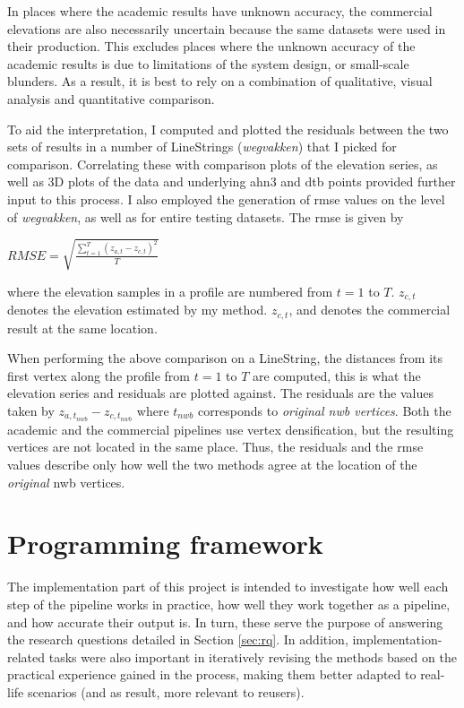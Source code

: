 In places where the academic results have unknown accuracy, the commercial elevations are also necessarily uncertain because the same datasets were used in their production. This excludes places where the unknown accuracy of the academic results is due to limitations of the system design, or small-scale blunders. As a result, it is best to rely on a combination of qualitative, visual analysis and quantitative comparison.

To aid the interpretation, I computed and plotted the residuals between the two sets of results in a number of LineStrings (\textit{wegvakken}) that I picked for comparison. Correlating these with comparison plots of the elevation series, as well as 3D plots of the data and underlying \ac{ahn3} and \ac{dtb} points provided further input to this process. I also employed the generation of \ac{rmse} values on the level of \textit{wegvakken}, as well as for entire testing datasets. The \ac{rmse} is given by

$RMSE = \sqrt{\frac{\sum_{t=1}^{T}\left(z_{a,t} - z_{c,t}\right)^2}{T}}$

where the elevation samples in a profile are numbered from $t=1$ to $T$. $z_{c,t}$ denotes the elevation estimated by my method. $z_{c,t}$, and denotes the commercial result at the same location.

When performing the above comparison on a LineString, the distances from its first vertex along the profile from $t=1$ to $T$ are computed, this is what the elevation series and residuals are plotted against. The residuals are the values taken by $z_{a,t_{nwb}} - z_{c,t_{nwb}}$ where $t_{nwb}$ corresponds to \textit{original \ac{nwb} vertices}. Both the academic and the commercial pipelines use vertex densification, but the resulting vertices are not located in the same place. Thus, the residuals and the \ac{rmse} values describe only how well the two methods agree at the location of the \textit{original} \ac{nwb} vertices.

\section{Programming framework}
\label{sec:programming}

The implementation part of this project is intended to investigate how well each step of the pipeline works in practice, how well they work together as a pipeline, and how accurate their output is. In turn, these serve the purpose of answering the research questions detailed in Section \ref{sec:rq}. In addition, implementation-related tasks were also important in iteratively revising the methods based on the practical experience gained in the process, making them better adapted to real-life scenarios (and as result, more relevant to reusers).

